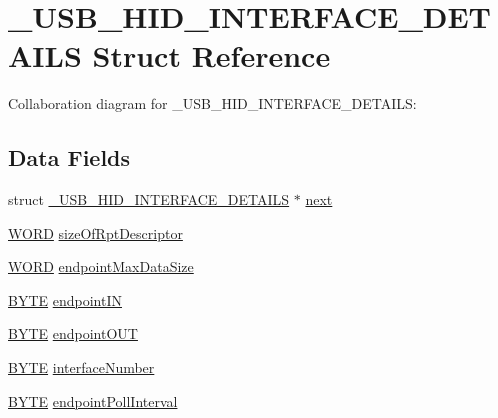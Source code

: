 \hypertarget{struct___u_s_b___h_i_d___i_n_t_e_r_f_a_c_e___d_e_t_a_i_l_s}{}\section{\+\_\+\+U\+S\+B\+\_\+\+H\+I\+D\+\_\+\+I\+N\+T\+E\+R\+F\+A\+C\+E\+\_\+\+D\+E\+T\+A\+I\+L\+S Struct Reference}
\label{struct___u_s_b___h_i_d___i_n_t_e_r_f_a_c_e___d_e_t_a_i_l_s}


Collaboration diagram for \+\_\+\+U\+S\+B\+\_\+\+H\+I\+D\+\_\+\+I\+N\+T\+E\+R\+F\+A\+C\+E\+\_\+\+D\+E\+T\+A\+I\+L\+S\+:
\subsection*{Data Fields}
\begin{DoxyCompactItemize}
\item 
struct \hyperlink{struct___u_s_b___h_i_d___i_n_t_e_r_f_a_c_e___d_e_t_a_i_l_s}{\+\_\+\+U\+S\+B\+\_\+\+H\+I\+D\+\_\+\+I\+N\+T\+E\+R\+F\+A\+C\+E\+\_\+\+D\+E\+T\+A\+I\+L\+S} $\ast$ \hyperlink{struct___u_s_b___h_i_d___i_n_t_e_r_f_a_c_e___d_e_t_a_i_l_s_a23a3ff536a3ae02b8aac03f48803dc54}{next}
\item 
\hyperlink{_generic_type_defs_8h_a2b0e863dadf920709ec53d9088ee7c91}{W\+O\+R\+D} \hyperlink{struct___u_s_b___h_i_d___i_n_t_e_r_f_a_c_e___d_e_t_a_i_l_s_a2b18732fddc09ad61db730b3029fc0c0}{size\+Of\+Rpt\+Descriptor}
\item 
\hyperlink{_generic_type_defs_8h_a2b0e863dadf920709ec53d9088ee7c91}{W\+O\+R\+D} \hyperlink{struct___u_s_b___h_i_d___i_n_t_e_r_f_a_c_e___d_e_t_a_i_l_s_a07b1a90d117cf469938e2f47a3e6183c}{endpoint\+Max\+Data\+Size}
\item 
\hyperlink{_generic_type_defs_8h_a4ae1dab0fb4b072a66584546209e7d58}{B\+Y\+T\+E} \hyperlink{struct___u_s_b___h_i_d___i_n_t_e_r_f_a_c_e___d_e_t_a_i_l_s_a7315b8753e0b037bc146e042802ebb68}{endpoint\+I\+N}
\item 
\hyperlink{_generic_type_defs_8h_a4ae1dab0fb4b072a66584546209e7d58}{B\+Y\+T\+E} \hyperlink{struct___u_s_b___h_i_d___i_n_t_e_r_f_a_c_e___d_e_t_a_i_l_s_af9c36438db4920f863a43c2662548c47}{endpoint\+O\+U\+T}
\item 
\hyperlink{_generic_type_defs_8h_a4ae1dab0fb4b072a66584546209e7d58}{B\+Y\+T\+E} \hyperlink{struct___u_s_b___h_i_d___i_n_t_e_r_f_a_c_e___d_e_t_a_i_l_s_ab1e86a4ed2aed02a538fa15d50470ad7}{interface\+Number}
\item 
\hyperlink{_generic_type_defs_8h_a4ae1dab0fb4b072a66584546209e7d58}{B\+Y\+T\+E} \hyperlink{struct___u_s_b___h_i_d___i_n_t_e_r_f_a_c_e___d_e_t_a_i_l_s_ae369dac581a9a365cad424e7c605544c}{endpoint\+Poll\+Interval}
\end{DoxyCompactItemize}


